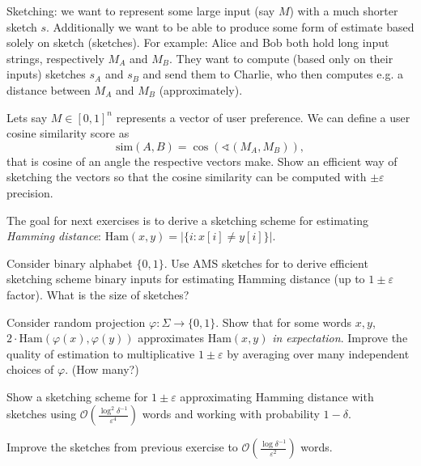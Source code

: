 \documentclass[12pt]{uebung}
\begin{document}
 


\renewcommand{\aufgname}{Exercise}

Sketching: we want to represent some large input (say $M$) with a much shorter sketch $s$. Additionally we want to be able to produce some form of estimate based solely on sketch (sketches). For example: Alice and Bob both hold long input strings, respectively $M_A$ and $M_B$. They want to compute (based only on their inputs) sketches $s_A$ and $s_B$ and send them to Charlie, who then computes e.g. a distance between $M_A$ and $M_B$ (approximately).

\begin{aufg}
Lets say $M \in [0,1]^n$ represents a vector of user preference. We can define a user cosine similarity score as
$$\textrm{sim}(A,B) = \cos( \sphericalangle(M_A,M_B)),$$
that is cosine of an angle the respective vectors make.
Show an efficient way of sketching the vectors so that the cosine similarity can be computed with $\pm \varepsilon$ precision.
\end{aufg}

\vfill

The goal for next exercises is to derive a sketching scheme for estimating \emph{Hamming distance}: $\textrm{Ham}(x,y) = | \{ i : x[i] \not= y[i] \} |$.

\begin{aufg}
Consider binary alphabet $\{0,1\}$. Use AMS sketches for to derive efficient sketching scheme  binary inputs for estimating Hamming distance (up to $1\pm\varepsilon$ factor). What is the size of sketches?
\end{aufg}

\begin{aufg}
Consider random projection $\varphi : \Sigma \to \{0,1\}$.  Show that for some words $x,y$, $2 \cdot \textrm{Ham}(\varphi(x), \varphi(y))$ approximates $\textrm{Ham}(x,y)$ \emph{in expectation}. Improve the quality of estimation to multiplicative $1\pm \varepsilon$ by averaging over many independent choices of $\varphi$. (How many?)
\end{aufg}

\begin{aufg}
Show a sketching scheme for $1\pm \varepsilon$ approximating Hamming distance with sketches using $\mathcal{O}(\frac{\log^2 \delta^{-1}}{\varepsilon^4})$ words and working with probability $1-\delta$.
\end{aufg}

\begin{aufg}[2 pts]
Improve the sketches from previous exercise to $\mathcal{O}(\frac{\log \delta^{-1}}{\varepsilon^2})$ words.
\end{aufg}
\end{document}
